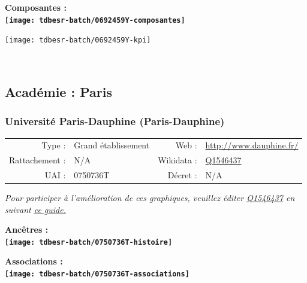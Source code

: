 \documentclass[12pt,french,]{article}
\begin{document}
\hrulefill

\begin{center} \bf Composantes : \\  
\texttt{[image: tdbesr-batch/0692459Y-composantes]} \end{center}

\begin{center}\texttt{[image: tdbesr-batch/0692459Y-kpi]} \end{center}\checkoddpage

\ifoddpage ~\newpage \fi   

\hypertarget{acaduxe9mie-paris-1}{%
\subsection{Académie : Paris}\label{acaduxe9mie-paris-1}}

\hypertarget{universituxe9-paris-dauphine-paris-dauphine}{%
\subsubsection{Université Paris-Dauphine
(Paris-Dauphine)}\label{universituxe9-paris-dauphine-paris-dauphine}}

\begin{tabular*}{\textwidth}{rp{5cm}rl}  
\hline  
Type : & Grand établissement & Web : &\href{http://www.dauphine.fr/}{http://www.dauphine.fr/} \\  
Rattachement : & N/A & Wikidata : & \href{https://www.wikidata.org/entity/Q1546437}{Q1546437} \\  
UAI : & 0750736T & Décret : & N/A \\  
\hline  
\end{tabular*}

\textit{\scriptsize Pour participer à l'amélioration de ces graphiques, veuillez éditer  \href{https://www.wikidata.org/entity/Q1546437}{Q1546437}  en suivant \href{https://github.com/cpesr/wikidataESR/blob/master/Rmd/wikidataESR.md}{ce guide.}}

\vspace{1cm}  
\begin{minipage}[b]{0.50\textwidth}\begin{center} \bf Ancêtres : \\  
\texttt{[image: tdbesr-batch/0750736T-histoire]} \end{center}\end{minipage}\begin{minipage}[b]{0.50\textwidth}\begin{center} \bf Associations : \\  
\texttt{[image: tdbesr-batch/0750736T-associations]} \end{center}\end{minipage}
\end{document}
